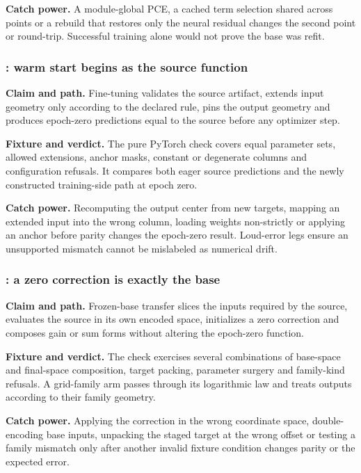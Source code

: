 \textbf{Catch power.}  A module-global PCE, a cached term selection shared
across points or a rebuild that restores only the neural residual changes the
second point or round-trip.  Successful training alone would not prove the
base was refit.

\subsubsection{: warm start begins as the source function}

\textbf{Claim and path.}  Fine-tuning validates the source artifact, extends
input geometry only according to the declared rule, pins the output geometry
and produces epoch-zero predictions equal to the source before any optimizer
step.

\textbf{Fixture and verdict.}  The pure PyTorch check covers equal parameter
sets, allowed extensions, anchor masks, constant or degenerate columns and
configuration refusals.  It compares both eager source predictions and the
newly constructed training-side path at epoch zero.

\textbf{Catch power.}  Recomputing the output center from new targets, mapping
an extended input into the wrong column, loading weights non-strictly or
applying an anchor before parity changes the epoch-zero result.  Loud-error
legs ensure an unsupported mismatch cannot be mislabeled as numerical drift.

\subsubsection{: a zero correction is exactly the base}

\textbf{Claim and path.}  Frozen-base transfer slices the inputs required by
the source, evaluates the source in its own encoded space, initializes a zero
correction and composes gain or sum forms without altering the epoch-zero
function.

\textbf{Fixture and verdict.}  The check exercises several combinations of
base-space and final-space composition, target packing, parameter surgery
and family-kind refusals.  A grid-family arm passes through its logarithmic
law and treats outputs according to their family geometry.

\textbf{Catch power.}  Applying the correction in the wrong coordinate space,
double-encoding base inputs, unpacking the staged target at the wrong offset
or testing a family mismatch only after another invalid fixture condition
changes parity or the expected error.

